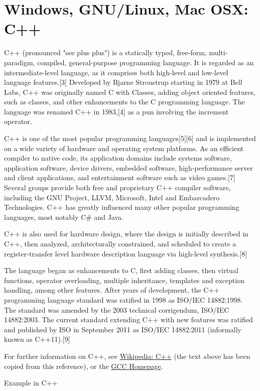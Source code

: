 \newpage
\section{Windows, GNU/Linux, Mac OSX: C++}
C++ (pronounced "see plus plus") is a statically typed, free-form, multi-paradigm, compiled, general-purpose programming language. It is regarded as an intermediate-level language, as it comprises both high-level and low-level language features.[3] Developed by Bjarne Stroustrup starting in 1979 at Bell Labs, C++ was originally named C with Classes, adding object oriented features, such as classes, and other enhancements to the C programming language. The language was renamed C++ in 1983,[4] as a pun involving the increment operator.

\vpara
C++ is one of the most popular programming languages[5][6] and is implemented on a wide variety of hardware and operating system platforms. As an efficient compiler to native code, its application domains include systems software, application software, device drivers, embedded software, high-performance server and client applications, and entertainment software such as video games.[7] Several groups provide both free and proprietary C++ compiler software, including the GNU Project, LLVM, Microsoft, Intel and Embarcadero Technologies. C++ has greatly influenced many other popular programming languages, most notably C\# and Java.

\vpara
C++ is also used for hardware design, where the design is initially described in C++, then analyzed, architecturally constrained, and scheduled to create a register-transfer level hardware description language via high-level synthesis.[8]

\vpara
The language began as enhancements to C, first adding classes, then virtual functions, operator overloading, multiple inheritance, templates and exception handling, among other features. After years of development, the C++ programming language standard was ratified in 1998 as ISO/IEC 14882:1998. The standard was amended by the 2003 technical corrigendum, ISO/IEC 14882:2003. The current standard extending C++ with new features was ratified and published by ISO in September 2011 as ISO/IEC 14882:2011 (informally known as C++11).[9]

\vpara
For further information on C++, see \href{http://en.wikipedia.org/wiki/C\%2B\%2B}{Wikipedia: C++} (the text above has been copied from this reference), or the  \href{http://gcc.gnu.org/}{GCC Homepage}.


\vpara
Example in C++


